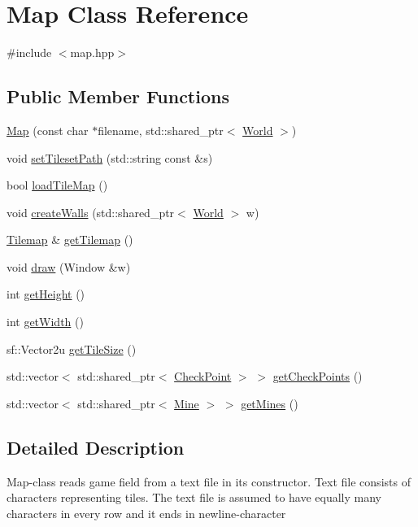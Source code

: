 \hypertarget{classMap}{}\section{Map Class Reference}
\label{classMap}


{\ttfamily \#include $<$map.\+hpp$>$}

\subsection*{Public Member Functions}
\begin{DoxyCompactItemize}
\item 
\hyperlink{classMap_a067a9c057cdf715cbe1484efad9bff27}{Map} (const char $\ast$filename, std\+::shared\+\_\+ptr$<$ \hyperlink{classWorld}{World} $>$)
\item 
void \hyperlink{classMap_accb446c23d408f95e6944fedc742b79f}{set\+Tileset\+Path} (std\+::string const \&s)
\item 
bool \hyperlink{classMap_ae184e30853864425b327b2d5b3cba48b}{load\+Tile\+Map} ()
\item 
void \hyperlink{classMap_a122f46ddff5b5d0b8377425a9a176502}{create\+Walls} (std\+::shared\+\_\+ptr$<$ \hyperlink{classWorld}{World} $>$ w)
\item 
\hyperlink{classTilemap}{Tilemap} \& \hyperlink{classMap_ae1ab0f7883bad946493c6a7f896966f0}{get\+Tilemap} ()
\item 
void \hyperlink{classMap_aa1621a8865fc469ae9c05c08967e4f2c}{draw} (Window \&w)
\item 
int \hyperlink{classMap_a2b09c8875af2efb711fc3a022e70427d}{get\+Height} ()
\item 
int \hyperlink{classMap_afd34d12227676b3cebeed9f5fae2508f}{get\+Width} ()
\item 
sf\+::\+Vector2u \hyperlink{classMap_a97717641214ebe1e105b4afcf412fbb3}{get\+Tile\+Size} ()
\item 
std\+::vector$<$ std\+::shared\+\_\+ptr$<$ \hyperlink{classCheckPoint}{Check\+Point} $>$ $>$ \hyperlink{classMap_a5de4ef4f3422d815f28d8e609964a449}{get\+Check\+Points} ()
\item 
std\+::vector$<$ std\+::shared\+\_\+ptr$<$ \hyperlink{classMine}{Mine} $>$ $>$ \hyperlink{classMap_a5c116280551e3b49145e7d30d392c429}{get\+Mines} ()
\end{DoxyCompactItemize}


\subsection{Detailed Description}
Map-\/class reads game field from a text file in its constructor. Text file consists of characters representing tiles. The text file is assumed to have equally many characters in every row and it ends in newline-\/character 

